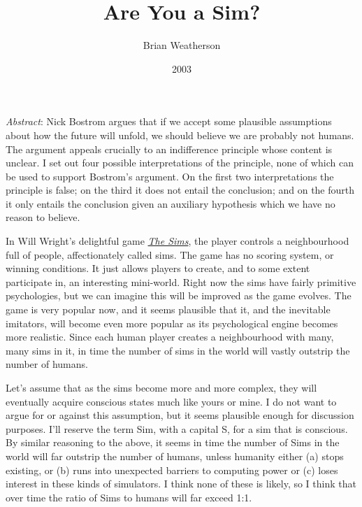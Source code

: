 \documentclass[
  11pt,
  letterpaper,
  DIV=11,
  numbers=noendperiod,
  twoside]{scrartcl}
\title{Are You a Sim?}
\author{Brian Weatherson}
\date{2003}
\renewenvironment{abstract}
 {\vspace{-1.25cm}
 \quotation\small\noindent\emph{Abstract}:}
 {\endquotation}
\begin{document}
\maketitle
\begin{abstract}
Nick Bostrom argues that if we accept some plausible assumptions about
how the future will unfold, we should believe we are probably not
humans. The argument appeals crucially to an indifference principle
whose content is unclear. I set out four possible interpretations of the
principle, none of which can be used to support Bostrom's argument. On
the first two interpretations the principle is false; on the third it
does not entail the conclusion; and on the fourth it only entails the
conclusion given an auxiliary hypothesis which we have no reason to
believe.
\end{abstract}


In Will Wright's delightful game \href{http://thesims.ea.com/}{\emph{The
Sims}}, the player controls a neighbourhood full of people,
affectionately called sims. The game has no scoring system, or winning
conditions. It just allows players to create, and to some extent
participate in, an interesting mini-world. Right now the sims have
fairly primitive psychologies, but we can imagine this will be improved
as the game evolves. The game is very popular now, and it seems
plausible that it, and the inevitable imitators, will become even more
popular as its psychological engine becomes more realistic. Since each
human player creates a neighbourhood with many, many sims in it, in time
the number of sims in the world will vastly outstrip the number of
humans.

Let's assume that as the sims become more and more complex, they will
eventually acquire conscious states much like yours or mine. I do not
want to argue for or against this assumption, but it seems plausible
enough for discussion purposes. I'll reserve the term Sim, with a
capital S, for a sim that is conscious. By similar reasoning to the
above, it seems in time the number of Sims in the world will far
outstrip the number of humans, unless humanity either (a) stops
existing, or (b) runs into unexpected barriers to computing power or (c)
loses interest in these kinds of simulators. I think none of these is
likely, so I think that over time the ratio of Sims to humans will far
exceed 1:1.
\end{document}
